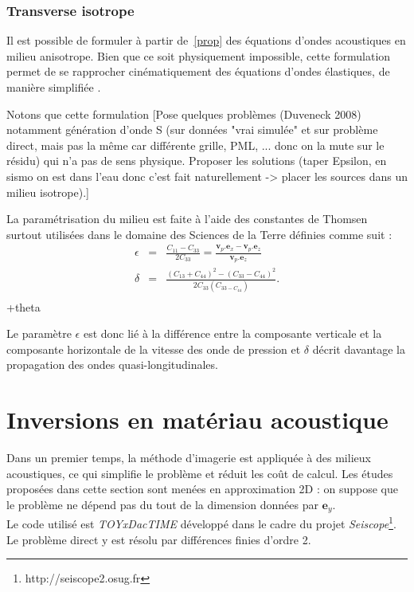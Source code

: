 \subsubsection{Transverse isotrope}

Il est possible de formuler à partir de~\ref{prop} des équations d'ondes acoustiques en milieu anisotrope. Bien que ce soit physiquement impossible, cette formulation permet de se rapprocher cinématiquement des équations d'ondes élastiques, de manière simplifiée \citep{alkhalifah}.

Notons que cette formulation [Pose quelques problèmes (Duveneck 2008) notamment génération d'onde S (sur données "vrai simulée"  et sur problème direct, mais pas la même car différente grille, PML, ... donc on la mute sur le résidu) qui n'a pas de sens physique. Proposer les solutions (taper Epsilon, en sismo on est dans l'eau donc c'est fait naturellement -> placer les sources dans un milieu isotrope).]
 

La paramétrisation du milieu est faite à l'aide des constantes de Thomsen~\citep{thomsen} surtout utilisées dans le domaine des Sciences de la Terre définies comme suit : 
\begin{eqnarray}
	\epsilon & =  & \frac{C_{11}-C_{33}}{2C_{33}} = \frac{\bm{v}_{p}.\bm{e}_{x} -  \bm{v}_{p}.\bm{e}_{z}}{\bm{v}_{p}.\bm{e}_{z}}\\
	\delta & = & \frac{(C_{13}+C_{44})^2-(C_{33}-C_{44})^2}{2C_{33}(C_{33-C_{44}})}\text{.}\\
\end{eqnarray}
+theta

Le paramètre $\epsilon$ est donc lié à la différence entre la composante verticale et la composante horizontale de la vitesse des onde de pression et $\delta$ décrit davantage la propagation des ondes quasi-longitudinales.



\section{Inversions en matériau acoustique }

Dans un premier temps, la méthode d'imagerie est appliquée à des milieux acoustiques, ce qui simplifie le problème et réduit les coût de calcul. Les études proposées dans cette section sont menées en approximation 2D : on suppose que le problème ne dépend pas du tout de la dimension données par $\bm{e}_{y}$.\\

Le code utilisé est \emph{TOYxDacTIME} développé dans le cadre du projet \emph{Seiscope}\footnote{http://seiscope2.osug.fr}. Le problème direct y est résolu par différences finies d'ordre 2.

